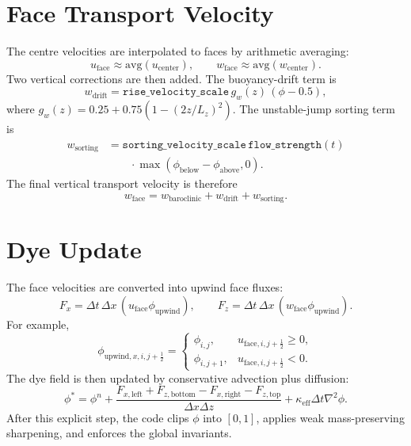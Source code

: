 \documentclass[10pt,twocolumn]{article}
\begin{document}
\section*{Face Transport Velocity}
The centre velocities are interpolated to faces by arithmetic averaging:
\begin{equation}
  u_{\text{face}}\approx \mathrm{avg}(u_{\text{center}}), \qquad
  w_{\text{face}}\approx \mathrm{avg}(w_{\text{center}}).
\end{equation}
Two vertical corrections are then added. The buoyancy-drift term is
\begin{equation}
  w_{\text{drift}}
  =
  \texttt{rise\_velocity\_scale}\,g_w(z)\,(\phi-0.5),
\end{equation}
where $g_w(z)=0.25+0.75\left(1-(2z/L_z)^2\right)$. The unstable-jump sorting
term is
\begin{equation}
  \begin{aligned}
    w_{\text{sorting}}
    &=
    \texttt{sorting\_velocity\_scale}\,\texttt{flow\_strength}(t) \\
    &\qquad \cdot \max(\phi_{\text{below}}-\phi_{\text{above}},0).
  \end{aligned}
\end{equation}
The final vertical transport velocity is therefore
\begin{equation}
  w_{\text{face}}=
  w_{\text{baroclinic}}+w_{\text{drift}}+w_{\text{sorting}}.
\end{equation}

\section*{Dye Update}
The face velocities are converted into upwind face fluxes:
\begin{equation}
  F_x=\Delta t\,\Delta x\,(u_{\text{face}}\phi_{\text{upwind}}), \qquad
  F_z=\Delta t\,\Delta x\,(w_{\text{face}}\phi_{\text{upwind}}).
\end{equation}
For example,
\begin{equation}
  \phi_{\text{upwind},x,i,j+\frac{1}{2}}=
  \begin{cases}
    \phi_{i,j}, & u_{\text{face},i,j+\frac{1}{2}}\ge 0,\\
    \phi_{i,j+1}, & u_{\text{face},i,j+\frac{1}{2}}<0.
  \end{cases}
\end{equation}
The dye field is then updated by conservative advection plus diffusion:
\begin{equation}
  \phi^\ast=
  \phi^n+
  \frac{F_{x,\text{left}}+F_{z,\text{bottom}}-F_{x,\text{right}}-F_{z,\text{top}}}
       {\Delta x\Delta z}
  +\kappa_{\mathrm{eff}}\Delta t\nabla^2\phi.
\end{equation}
After this explicit step, the code clips $\phi$ into $[0,1]$, applies weak
mass-preserving sharpening, and enforces the global invariants.
\end{document}
